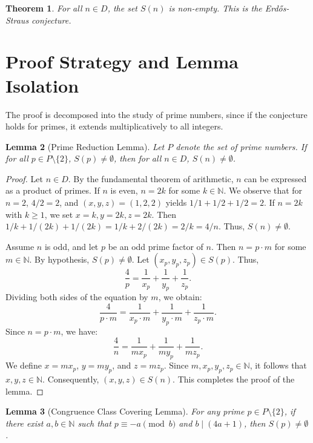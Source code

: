 \documentclass[12pt,a4paper]{article}
\newtheorem{theorem}{Theorem}[section]
\newtheorem{lemma}[theorem]{Lemma}
\begin{document}
\begin{theorem}
For all $n \in D$, the set $S(n)$ is non-empty. This is the Erd\H{o}s-Straus conjecture.
\end{theorem}

\section{Proof Strategy and Lemma Isolation}

The proof is decomposed into the study of prime numbers, since if the conjecture holds for primes, it extends multiplicatively to all integers.

\begin{lemma}[Prime Reduction Lemma]
Let $P$ denote the set of prime numbers. If for all $p \in P \setminus \{2\}$, $S(p) \neq \emptyset$, then for all $n \in D$, $S(n) \neq \emptyset$.
\end{lemma}

\begin{proof}
Let $n \in D$. By the fundamental theorem of arithmetic, $n$ can be expressed as a product of primes.
If $n$ is even, $n = 2k$ for some $k \in \mathbb{N}$. We observe that for $n = 2$, $4/2 = 2$, and $(x,y,z) = (1, 2, 2)$ yields $1/1 + 1/2 + 1/2 = 2$. If $n = 2k$ with $k \ge 1$, we set $x = k, y = 2k, z = 2k$. Then $1/k + 1/(2k) + 1/(2k) = 1/k + 2/(2k) = 2/k = 4/n$. Thus, $S(n) \neq \emptyset$.

Assume $n$ is odd, and let $p$ be an odd prime factor of $n$. Then $n = p \cdot m$ for some $m \in \mathbb{N}$.
By hypothesis, $S(p) \neq \emptyset$. Let $(x_p, y_p, z_p) \in S(p)$. Thus,
\[
\frac{4}{p} = \frac{1}{x_p} + \frac{1}{y_p} + \frac{1}{z_p}.
\]
Dividing both sides of the equation by $m$, we obtain:
\[
\frac{4}{p \cdot m} = \frac{1}{x_p \cdot m} + \frac{1}{y_p \cdot m} + \frac{1}{z_p \cdot m}.
\]
Since $n = p \cdot m$, we have:
\[
\frac{4}{n} = \frac{1}{m x_p} + \frac{1}{m y_p} + \frac{1}{m z_p}.
\]
We define $x = m x_p$, $y = m y_p$, and $z = m z_p$. Since $m, x_p, y_p, z_p \in \mathbb{N}$, it follows that $x, y, z \in \mathbb{N}$.
Consequently, $(x, y, z) \in S(n)$. This completes the proof of the lemma.
\end{proof}

\begin{lemma}[Congruence Class Covering Lemma]
For any prime $p \in P \setminus \{2\}$, if there exist $a, b \in \mathbb{N}$ such that $p \equiv -a \pmod b$ and $b \mid (4a + 1)$, then $S(p) \neq \emptyset$.
\end{lemma}
\end{document}
